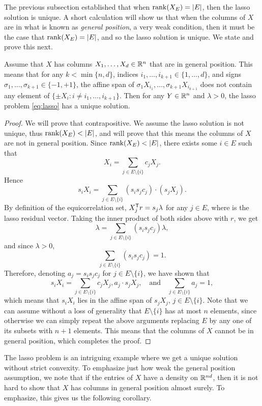 \documentclass{article}
\begin{document}
The previous subsection established that when $\mathrm{rank}(X_E) = |E|$, then the lasso
solution is unique. A short calculation will show us that when the columns of 
$X$ are in what is known as \emph{general position}, a very weak condition, then
it must be the case that $\mathrm{rank}(X_E) = |E|$, and so the lasso solution is
unique. We state and prove this next.    

\begin{proposition}
Assume that $X$ has columns $X_1,\dots,X_d \in \mathbb{R}^n$ that are in general
position. This means that for any $k < \min\{n,d\}$, indices $i_1,\dots,i_{k+1} 
\in \{1,\dots,d\}$, and signs $\sigma_1,\dots,\sigma_{k+1} \in \{-1,+1\}$, the 
affine span of $\sigma_1 X_{i_1}, \dots,\sigma_{k+1} X_{i_{k+1}}$ does not
contain any element of $\{\pm X_i : i \not= i_1,\dots,i_{k+1}\}$. Then for any
$Y \in \mathbb{R}^n$ and $\lambda>0$, the lasso problem \eqref{eq:lasso} has a unique
solution. 
\end{proposition}

\begin{proof}
We will prove that contrapositive. We assume the lasso solution is not unique,
thus $\mathrm{rank}(X_E) < |E|$, and will prove that this means the columns of $X$ are
not in general position. Since $\mathrm{rank}(X_E) < |E|$, there exists some $i \in E$
such that 
\[
X_i = \sum_{j \in E\setminus\{i\}} c_j X_j.
\]
Hence
\[
s_i X_i = \sum_{j \in E\setminus\{i\}} (s_i s_j c_j) \cdot (s_j X_j).
\]
By definition of the equicorrelation set, $X_j^{\mathsf{T}} r = s_j \lambda$ for any $j
\in E$, where  is the lasso residual vector. Taking the
inner  product of both sides above with $r$, we get 
\[
\lambda = \sum_{j \in E\setminus\{i\}} (s_i s_j c_j) \lambda,
\]
and since $\lambda>0$,
\[
\sum_{j \in E\setminus\{i\}} (s_i s_j c_j) = 1.
\]
Therefore, denoting $a_j = s_i s_j c_j$ for $j \in E\setminus\{i\}$, we have
shown that
\[
s_i X_i = \sum_{j \in E\setminus\{i\}} c_j X_j,
a_j \cdot s_j X_j, \quad \text{and} \quad 
\sum_{j \in E\setminus\{i\}} a_j = 1,
\]
which means that $s_iX_i$ lies in the affine span of $s_jX_j$, $j \in
E\setminus\{i\}$. Note that we can assume without a loss of generality that  
$E\setminus\{i\}$ has at most $n$ elements, since otherwise we can simply repeat
the above arguments replacing $E$ by any one of its subsets with $n+1$
elements. This means that the columns of $X$ cannot be in general position,
which completes the proof. 
\end{proof}

The lasso problem is an intriguing example where we get a unique solution
without strict convexity. To emphasize just how weak the general position
assumption, we note that if the entries of $X$ have a density on $\mathbb{R}^{nd}$, then
it is not hard to show that $X$ has columns in general position almost surely.
To emphasize, this gives us the following corollary.      
\end{document}
